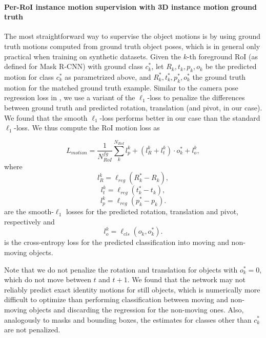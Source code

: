 \paragraph{Per-RoI instance motion supervision with 3D instance motion ground truth}
The most straightforward way to supervise the object motions is by using ground truth
motions computed from ground truth object poses, which is in general
only practical when training on synthetic datasets.
Given the $k$-th foreground RoI (as defined for Mask R-CNN) with ground class $c_k^*$,
let $R_k, t_k, p_k, o_k$ be the predicted motion for class $c_k^*$ as parametrized above,
and $R_k^*, t_k^*, p_k^*, o_k^*$ the ground truth motion for the matched ground truth example.
Similar to the camera pose regression loss in \cite{PoseNet2},
we use a variant of the $\ell_1$-loss to penalize the differences between ground truth and predicted
rotation, translation (and pivot, in our case). We found that the smooth $\ell_1$-loss
performs better in our case than the standard $\ell_1$-loss.
We thus compute the RoI motion loss as

\begin{equation}
L_{motion} = \frac{1}{N_{RoI}^{fg}} \sum_k^{N_{RoI}} l_{p}^k + (l_{R}^k + l_{t}^k) \cdot o_k^* + l_o^k,
\end{equation}
where
\begin{equation}
l_{R}^k = \ell_{reg} (R_k^* - R_k),
\end{equation}
\begin{equation}
l_{t}^k = \ell_{reg} (t_k^* - t_k),
\end{equation}
\begin{equation}
l_{p}^k = \ell_{reg} (p_k^* - p_k).
\end{equation}
are the smooth-$\ell_1$ losses for the predicted rotation, translation and pivot,
respectively and
\begin{equation}
l_o^k = \ell_{cls}(o_k, o_k^*).
\end{equation}
is the cross-entropy loss for the predicted classification into moving and non-moving objects.

Note that we do not penalize the rotation and translation for objects with
$o_k^* = 0$, which do not move between $t$ and $t+1$. We found that the network
may not reliably predict exact identity motions for still objects, which is
numerically more difficult to optimize than performing classification between
moving and non-moving objects and discarding the regression for the non-moving
ones. Also, analogously to masks and bounding boxes, the estimates for classes
other than $c_k^*$ are not penalized.

